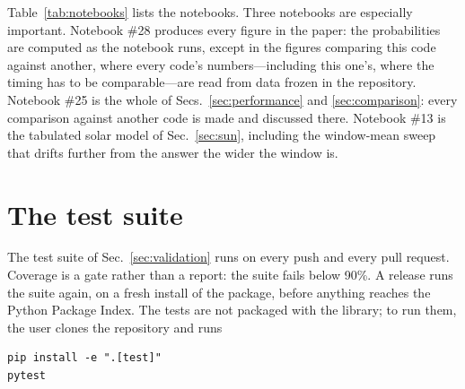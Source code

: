 \documentclass[final,5p,times,twocolumn,sort,compress]{elsarticle}
\makeatletter
\DeclareRobustCommand{\_}{%
  \ifmmode\nfss@text{\textunderscore}\else\textunderscore\allowbreak\fi}
\newcommand{\Tab}{Table}
\newcommand{\tabl}[1]{\Tab~\ref{tab:#1}}
\makeatother
\begin{document}
\tabl{notebooks} lists the notebooks. Three notebooks are especially important. Notebook \#28 produces every figure in the paper: the probabilities are computed as the notebook runs, except in the figures comparing this code against another, where every code's numbers---including this one's, where the timing has to be comparable---are read from data frozen in the repository. Notebook \#25 is the whole of Secs.~\ref{sec:performance} and \ref{sec:comparison}: every comparison against another code is made and discussed there. Notebook \#13 is the tabulated solar model of Sec.~\ref{sec:sun}, including the window-mean sweep that drifts further from the answer the wider the window is.


\section{The test suite}
\label{app:tests}
\appresetfloats

The test suite of Sec.~\ref{sec:validation} runs on every push and every pull request. Coverage is a gate rather than a report: the suite fails below 90\%. A release runs the suite again, on a fresh install of the package, before anything reaches the Python Package Index. The tests are not packaged with the library; to run them, the user clones the repository and runs
\begin{verbatim}
pip install -e ".[test]"
pytest
\end{verbatim}
\end{document}
